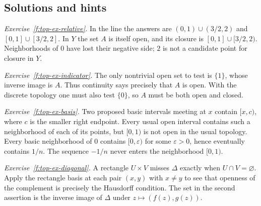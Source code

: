 \subsection*{Solutions and hints}
\noindent\emph{Exercise~\ref{f:top-ex-relative}.}
In the line the answers are $(0,1)\cup(3/2,2)$ and $[0,1]\cup[3/2,2]$. In $Y$ the set $A$ is itself open, and its closure is $[0,1]\cup[3/2,2)$. Neighborhoods of $0$ have lost their negative side; $2$ is not a candidate point for closure in $Y$.

\smallskip\noindent\emph{Exercise~\ref{f:top-ex-indicator}.}
The only nontrivial open set to test is $\{1\}$, whose inverse image is $A$. Thus continuity says precisely that $A$ is open. With the discrete topology one must also test $\{0\}$, so $A$ must be both open and closed.

\smallskip\noindent\emph{Exercise~\ref{f:top-ex-basis}.}
Two proposed basic intervals meeting at $x$ contain $[x,c)$, where $c$ is the smaller right endpoint. Every usual open interval contains such a neighborhood of each of its points, but $[0,1)$ is not open in the usual topology. Every basic neighborhood of $0$ contains $[0,\varepsilon)$ for some $\varepsilon>0$, hence eventually contains $1/n$. The sequence $-1/n$ never enters the neighborhood $[0,1)$.

\smallskip\noindent\emph{Exercise~\ref{f:top-ex-diagonal}.}
A rectangle $U\times V$ misses $\Delta$ exactly when $U\cap V=\varnothing$. Apply the rectangle basis at each pair $(x,y)$ with $x\ne y$ to see that openness of the complement is precisely the Hausdorff condition. The set in the second assertion is the inverse image of $\Delta$ under $z\mapsto(f(z),g(z))$.
